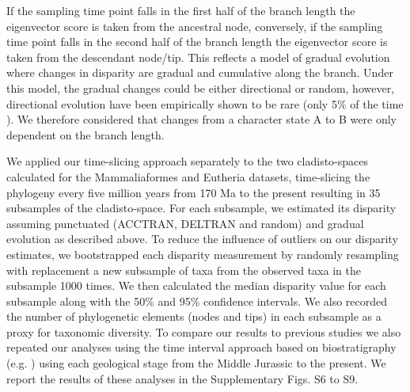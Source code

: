 \documentclass[12pt,letterpaper]{article}
\begin{document}
\begin{enumerate}
    If the sampling time point falls in the first half of the branch length the eigenvector score is taken from the ancestral node, conversely, if the sampling time point falls in the second half of the branch length the eigenvector score is taken from the descendant node/tip.
    This reflects a model of gradual evolution where changes in disparity are gradual and cumulative along the branch.
    Under this model, the gradual changes could be either directional or random, however, directional evolution have been empirically shown to be rare (only 5\% of the time \cite{Hunt21042015}).
    We therefore considered that changes from a character state A to B were only dependent on the branch length.
\end{enumerate}
We applied our time-slicing approach separately to the two cladisto-spaces calculated for the Mammaliaformes and Eutheria datasets, time-slicing the phylogeny every five million years from 170 Ma to the present resulting in 35 subsamples of the cladisto-space.
For each subsample, we estimated its disparity assuming punctuated (ACCTRAN, DELTRAN and random) and gradual evolution as described above.
To reduce the influence of outliers on our disparity estimates, we bootstrapped each disparity measurement by randomly resampling with replacement a new subsample of taxa from the observed taxa in the subsample 1000 times.
We then calculated the median disparity value for each subsample along with the 50\% and 95\% confidence intervals.
We also recorded the number of phylogenetic elements (nodes and tips) in each subsample as a proxy for taxonomic diversity.
To compare our results to previous studies we also repeated our analyses using the time interval approach based on biostratigraphy (e.g. \cite{Brusatte12092008}) using each geological stage from the Middle Jurassic to the present.
We report the results of these analyses in the Supplementary Figs. S6 to S9.

\end{document}
